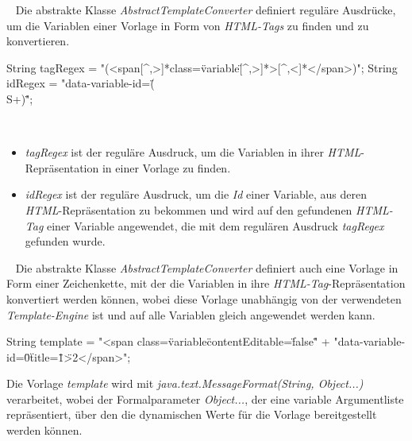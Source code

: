 \ \newline
Die abstrakte Klasse \emph{AbstractTemplateConverter} definiert reguläre Ausdrücke, um die Variablen einer Vorlage in Form von \emph{HTML-Tags} zu finden und zu konvertieren.
\begin{JavaCode}[numbers=none]
String tagRegex = "(<span[^,>]*class=\"variable\"[^,>]*>[^,<]*</span>)";
String idRegex = "data-variable-id=\"(\\S+)\"";
\end{JavaCode}
\ \begin{itemize}
	\item\emph{tagRegex} ist der reguläre Ausdruck, um die Variablen in ihrer \emph{HTML}-Repräsentation in einer Vorlage zu finden.
	\item\emph{idRegex} ist der reguläre Ausdruck, um die \emph{Id} einer Variable, aus deren \emph{HTML}-Repräsentation zu bekommen und wird auf den gefundenen \emph{HTML-Tag} einer Variable angewendet, die mit dem regulären Ausdruck \emph{tagRegex} gefunden wurde.
\end{itemize}
\ \newline
Die abstrakte Klasse \emph{AbstractTemplateConverter} definiert auch eine Vorlage in Form einer Zeichenkette, mit der die Variablen in ihre \emph{HTML-Tag}-Repräsentation konvertiert werden können, wobei diese Vorlage unabhängig von der verwendeten \emph{Template-Engine} ist und auf alle Variablen gleich angewendet werden kann.
\begin{JavaCode}
String template = "<span class=\"variable\" contentEditable=\"false\" "
                + "data-variable-id=\"{0}\" title=\"{1}\">{2}</span>";
\end{JavaCode}
Die Vorlage \emph{template} wird mit \emph{java.text.MessageFormat(String, Object...)} verarbeitet, wobei der Formalparameter \emph{Object...}, der eine variable Argumentliste repräsentiert, über den die dynamischen Werte für die Vorlage bereitgestellt werden können. 

